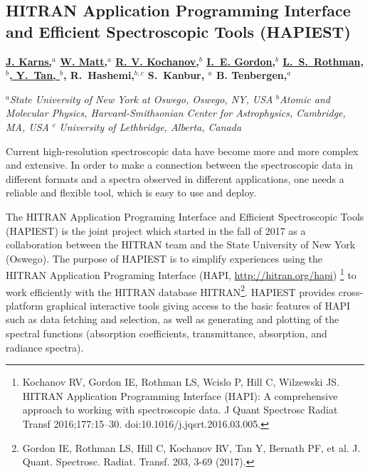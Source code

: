 \documentclass{article}
\begin{document}

\begin{center}
\section{HITRAN Application Programming Interface and Efficient Spectroscopic Tools (HAPIEST)}
\textbf{
    \underline{J. Karns,$^a$} \underline{W. Matt,$^a$} \underline{R. V. Kochanov,$^b$}  \underline{I.~E. Gordon,$^b$}
    \underline{L.~S.~Rothman}, \underline{$^b$, Y.~Tan, $^b$}, R.~Hashemi,$^{b,c}$ S.~Kanbur, $^a$  B. Tenbergen,$^a$
}
\end{center}

\begin{center}
$^a$\textit{State University of New York at Oswego, Oswego, NY, USA}
$^b$\textit{Atomic and Molecular Physics, Harvard-Smithsonian Center for Astrophysics, Cambridge, MA, USA}
$^c$\textit{ University of Lethbridge, Alberta, Canada}
\end{center}

Current high-resolution spectroscopic data have become more and more complex and extensive. In order to make a
connection between the spectroscopic data in different formats and a spectra observed in different applications, one
needs a reliable and flexible tool, which is easy to use and deploy.  

The HITRAN Application Programing Interface and Efficient Spectroscopic Tools (HAPIEST) is the joint project which
started in the fall of 2017 as a collaboration between the HITRAN team and the State University of New York (Oswego).
The purpose of HAPIEST is to simplify experiences using the HITRAN Application Programing Interface (HAPI,
\href{http://hitran.org/hapi}{http://hitran.org/hapi}) \footnote{Kochanov RV, Gordon IE, Rothman LS, Wcislo P, Hill C,
Wilzewski JS. HITRAN Application Programming Interface (HAPI): A comprehensive approach to working with spectroscopic
data. J Quant Spectrosc Radiat Transf 2016;177:15–30. doi:10.1016/j.jqsrt.2016.03.005.} to work efficiently with the
HITRAN database HITRAN\footnote{Gordon IE, Rothman LS, Hill C, Kochanov RV, Tan Y, Bernath PF, et al. J. Quant.
Spectrosc. Radiat. Transf. 203, 3-69 (2017).}.  HAPIEST provides cross-platform graphical interactive tools giving
access to the basic features of HAPI such as data fetching and selection, as well as generating and plotting of the
spectral functions (absorption coefficients, transmittance, absorption, and radiance spectra). 
\end{document}
